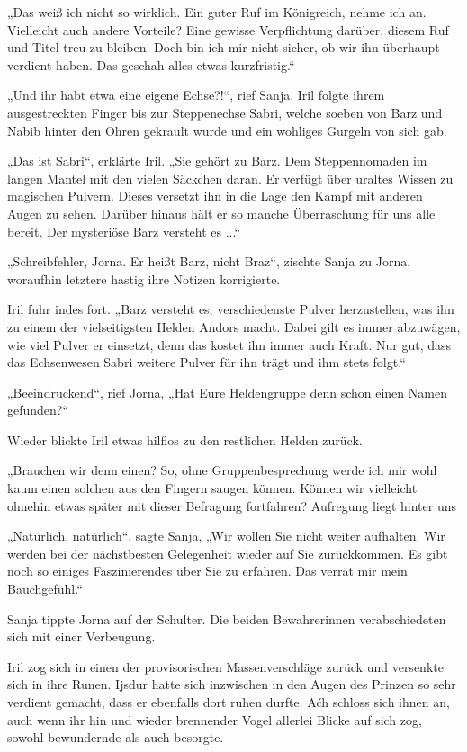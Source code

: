 „Das weiß ich nicht so wirklich. Ein guter Ruf im Königreich, nehme ich an. Vielleicht auch andere Vorteile? Eine gewisse Verpflichtung darüber, diesem Ruf und Titel treu zu bleiben. Doch bin ich mir nicht sicher, ob wir ihn überhaupt verdient haben. Das geschah alles etwas kurzfristig.“

„Und ihr habt etwa eine eigene Echse?!“, rief Sanja. Iril folgte ihrem ausgestreckten Finger bis zur Steppenechse Sabri, welche soeben von Barz und Nabib hinter den Ohren gekrault wurde und ein wohliges Gurgeln von sich gab.

„Das ist Sabri“, erklärte Iril. „Sie gehört zu Barz. Dem Steppennomaden im langen Mantel mit den vielen Säckchen daran. Er verfügt über uraltes Wissen zu magischen Pulvern. Dieses versetzt ihn in die Lage den Kampf mit anderen Augen zu sehen. Darüber hinaus hält er so manche Überraschung für uns alle bereit. Der mysteriöse Barz versteht es ...“

„Schreibfehler, Jorna. Er heißt Barz, nicht Braz“, zischte Sanja zu Jorna, woraufhin letztere hastig ihre Notizen korrigierte.

Iril fuhr indes fort. „Barz versteht es, verschiedenste Pulver herzustellen, was ihn zu einem der vielseitigsten Helden Andors macht. Dabei gilt es immer abzuwägen, wie viel Pulver er einsetzt, denn das kostet ihn immer auch Kraft. Nur gut, dass das Echsenwesen Sabri weitere Pulver für ihn trägt und ihm stets folgt.“

„Beeindruckend“, rief Jorna, „Hat Eure Heldengruppe denn schon einen Namen gefunden?“

Wieder blickte Iril etwas hilflos zu den restlichen Helden zurück.

„Brauchen wir denn einen? So, ohne Gruppenbesprechung werde ich mir wohl kaum einen solchen aus den Fingern saugen können. Können wir vielleicht ohnehin etwas später mit dieser Befragung fortfahren? Aufregung liegt hinter uns

„Natürlich, natürlich“, sagte Sanja, „Wir wollen Sie nicht weiter aufhalten. Wir werden bei der nächstbesten Gelegenheit wieder auf Sie zurückkommen. Es gibt noch so einiges Faszinierendes über Sie zu erfahren. Das verrät mir mein Bauchgefühl.“

Sanja tippte Jorna auf der Schulter. Die beiden Bewahrerinnen verabschiedeten sich mit einer Verbeugung.



\trennzeichen



Iril zog sich in einen der provisorischen Massenverschläge zurück und versenkte sich in ihre Runen. Ijsdur hatte sich inzwischen in den Augen des Prinzen so sehr verdient gemacht, dass er ebenfalls dort ruhen durfte. Aćh schloss sich ihnen an, auch wenn ihr hin und wieder brennender Vogel allerlei Blicke auf sich zog, sowohl bewundernde als auch besorgte.

